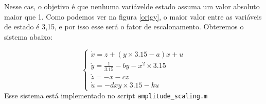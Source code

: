 \documentclass[12pt]{article}
\begin{document}
    Nesse cas, o objetivo é que nenhuma variávelde estado assuma um valor absoluto maior que 1. Como podemos ver na figura \ref{origy}, o maior valor entre as variáveis de estado é 3,15, e por isso esse será o fator de escalonamento. Obteremos o sistema abaixo:
    
    \begin{equation}
        \left\{
            \begin{array}{l}
              \dot{x} = z + (y\times3.15 - a)x + u\\
              \dot{y} = \frac{1}{3.15} - by - x^2\times3.15\\
              \dot{z} = -x - cz\\
              \dot{u} = -dxy\times3.15 - ku
            \end{array}
          \right.
    \end{equation}
    Esse sistema está implementado no script \texttt{amplitude\_scaling.m}
\end{document}

